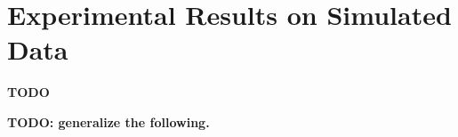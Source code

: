 \documentclass{article}
\theoremstyle{definition}
\newcommand{\Exit}{\textsc{Exit}}
\begin{document}
\section{Experimental Results on Simulated Data}

{\bf TODO}


\clearpage
{\bf TODO: generalize the following.} \par




\end{document}
